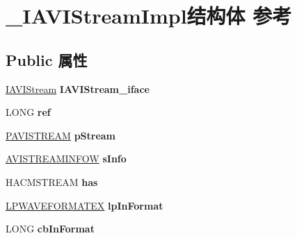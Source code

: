 \hypertarget{struct___i_a_v_i_stream_impl}{}\section{\+\_\+\+I\+A\+V\+I\+Stream\+Impl结构体 参考}
\label{struct___i_a_v_i_stream_impl}
\subsection*{Public 属性}
\begin{DoxyCompactItemize}
\item 
\mbox{\label{struct___i_a_v_i_stream_impl_a5c40f974148c3500e05b212e791d2e45}} 
\hyperlink{interface_i_a_v_i_stream}{I\+A\+V\+I\+Stream} {\bfseries I\+A\+V\+I\+Stream\+\_\+iface}
\item 
\mbox{\label{struct___i_a_v_i_stream_impl_a739bbf23e5337704f55db0e4742bd336}} 
L\+O\+NG {\bfseries ref}
\item 
\mbox{\label{struct___i_a_v_i_stream_impl_a6b50237f6786b52191af21d7501d8e33}} 
\hyperlink{interface_i_a_v_i_stream}{P\+A\+V\+I\+S\+T\+R\+E\+AM} {\bfseries p\+Stream}
\item 
\mbox{\label{struct___i_a_v_i_stream_impl_ab23e3bd97f86e50e9ce69e89d819bb3d}} 
\hyperlink{struct___a_v_i_s_t_r_e_a_m_i_n_f_o_w}{A\+V\+I\+S\+T\+R\+E\+A\+M\+I\+N\+F\+OW} {\bfseries s\+Info}
\item 
\mbox{\label{struct___i_a_v_i_stream_impl_a65dd3c46872a067bf1344e26681b8a48}} 
H\+A\+C\+M\+S\+T\+R\+E\+AM {\bfseries has}
\item 
\mbox{\label{struct___i_a_v_i_stream_impl_a4eaa60fd0fa0bc014f4460d45d0e743c}} 
\hyperlink{struct___w_a_v_e_f_o_r_m_a_t_e_x}{L\+P\+W\+A\+V\+E\+F\+O\+R\+M\+A\+T\+EX} {\bfseries lp\+In\+Format}
\item 
\mbox{\label{struct___i_a_v_i_stream_impl_a9019feb5fc3428e39d25223d12e63caa}} 
L\+O\+NG {\bfseries cb\+In\+Format}
\item 
\mbox{\label{struct___i_a_v_i_stream_impl_a7127f555b21e1b2af0c3fe7e73b9726a}} 

\end{DoxyCompactItemize}
